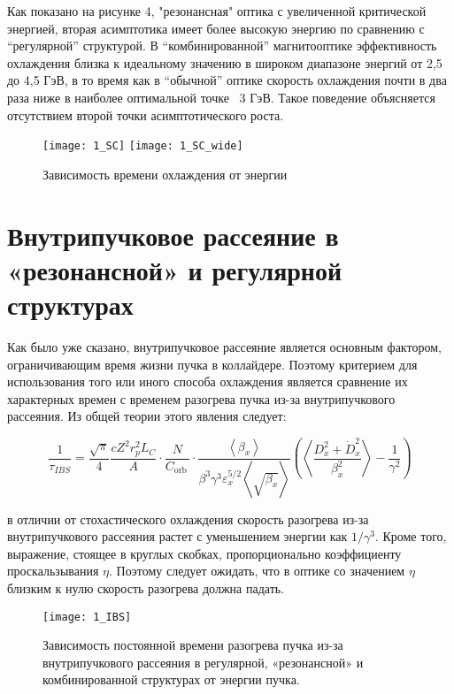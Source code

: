 \noindent Как показано на рисунке 4, "резонансная" оптика с увеличенной критической энергией, вторая асимптотика имеет более высокую энергию по сравнению с “регулярной” структурой. В “комбинированной” магнитооптике эффективность охлаждения близка к идеальному значению в широком диапазоне энергий от 2,5 до 4,5 ГэВ, в то время как в “обычной” оптике скорость охлаждения почти в два раза ниже в наиболее оптимальной точке ~3 ГэВ. Такое поведение объясняется отсутствием второй точки асимптотического роста.

\begin{figure}[!h]
  \centering
   \texttt{[image: 1\_SC]}
   \texttt{[image: 1\_SC\_wide]}
   \caption{Зависимость времени охлаждения от энергии}
   \label{fig:1_SC}
\end{figure}

\section{Внутрипучковое рассеяние в «резонансной» и регулярной структурах}\label{sec:ions_light/IBS_res_reg}

\par  Как было уже сказано, внутрипучковое рассеяние является основным фактором, ограничивающим время жизни пучка в коллайдере. Поэтому критерием для использования того или иного способа охлаждения является сравнение их характерных времен с временем разогрева пучка из-за внутрипучкового рассеяния. Из общей теории этого явления следует:

\begin{equation}
\frac{1}{\tau_{IBS}}=\frac{\sqrt\pi}{4}\frac{cZ^2r_p^2L_C}{A}\cdot\frac{N}{C_{\mathrm{orb\ }}}\cdot\frac{\left\langle\beta_x\right\rangle}{\beta^3\gamma^3\varepsilon_x^{5/2}\left\langle\sqrt{\beta_x}\right\rangle}\left(\left\langle\frac{D_x^2+{\dot{D}}_x^2}{\beta_x^2}\right\rangle-\frac{1}{\gamma^2}\right)
\end{equation}

\noindent в отличии от стохастического охлаждения скорость разогрева из-за внутрипучкового рассеяния растет с уменьшением энергии как $1/\gamma^3$. Кроме того, выражение, стоящее в круглых скобках, пропорционально коэффициенту проскальзывания $\eta$. Поэтому следует ожидать, что в оптике со значением $\eta$ близким к нулю скорость разогрева должна падать. 

\begin{figure}[!h]
  \centering
   \texttt{[image: 1\_IBS]}
   \caption{Зависимость постоянной времени разогрева пучка из-за внутрипучкового рассеяния в регулярной, «резонансной» и комбинированной структурах от энергии пучка.}
   \label{fig:1_IBS}
\end{figure}

